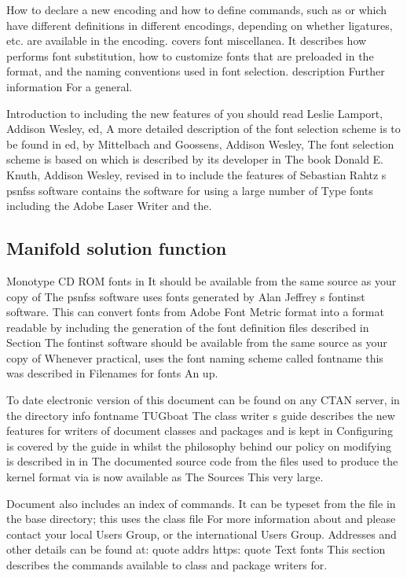 \documentclass{article}
\begin{document}
How to declare a new encoding and how to define commands, such as or which have different definitions in different encodings, depending on whether ligatures, etc. are available in the encoding. covers font miscellanea. It describes how performs font substitution, how to customize fonts that are preloaded in the format, and the naming conventions used in font selection. description Further information For a general.

Introduction to including the new features of you should read Leslie Lamport, Addison Wesley, ed, A more detailed description of the font selection scheme is to be found in ed, by Mittelbach and Goossens, Addison Wesley, The font selection scheme is based on which is described by its developer in The book Donald E. Knuth, Addison Wesley, revised in to include the features of Sebastian Rahtz s psnfss software contains the software for using a large number of Type fonts including the Adobe Laser Writer and the.

\subsection{Manifold solution function}
Monotype CD ROM fonts in It should be available from the same source as your copy of The psnfss software uses fonts generated by Alan Jeffrey s fontinst software. This can convert fonts from Adobe Font Metric format into a format readable by including the generation of the font definition files described in Section The fontinst software should be available from the same source as your copy of Whenever practical, uses the font naming scheme called fontname this was described in Filenames for fonts An up.

To date electronic version of this document can be found on any CTAN server, in the directory info fontname TUGboat The class writer s guide describes the new features for writers of document classes and packages and is kept in Configuring is covered by the guide in whilst the philosophy behind our policy on modifying is described in in The documented source code from the files used to produce the kernel format via is now available as The Sources This very large.

Document also includes an index of commands. It can be typeset from the file in the base directory; this uses the class file For more information about and please contact your local Users Group, or the international Users Group. Addresses and other details can be found at: quote addrs https: quote Text fonts This section describes the commands available to class and package writers for.
\end{document}
